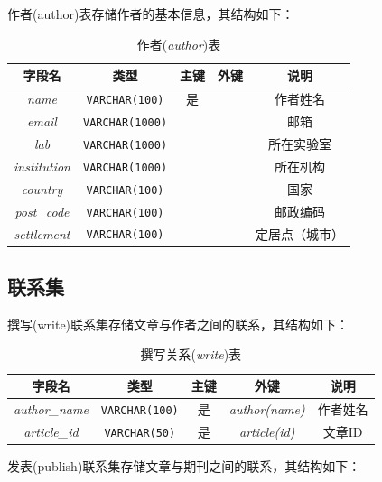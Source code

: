 \documentclass[UTF8,openany]{ctexbook}
\begin{document}
作者(author)表存储作者的基本信息，其结构如下：

\begin{table}[H]
    \centering
    \begin{tabular}{|c|c|c|c|c|}
        \hline
        \textbf{字段名} & \textbf{类型} & \textbf{主键} & \textbf{外键} & \textbf{说明} \\
        \hline
        \textit{name} & \texttt{VARCHAR(100)} & 是 &  & 作者姓名 \\
        \hline
        \textit{email} & \texttt{VARCHAR(1000)} &  &  & 邮箱 \\
        \hline
        \textit{lab} & \texttt{VARCHAR(1000)} &  &  & 所在实验室 \\
        \hline
        \textit{institution} & \texttt{VARCHAR(1000)} &  &  & 所在机构 \\
        \hline
        \textit{country} & \texttt{VARCHAR(100)} &  &  & 国家 \\
        \hline
        \textit{post\_code} & \texttt{VARCHAR(100)} &  &  & 邮政编码 \\
        \hline
        \textit{settlement} & \texttt{VARCHAR(100)} &  &  & 定居点（城市） \\
        \hline
    \end{tabular}
    \caption{作者(\textit{author})表}
\end{table}

\subsection{联系集}

撰写(write)联系集存储文章与作者之间的联系，其结构如下：

\begin{table}[H]
    \centering
    \begin{tabular}{|c|c|c|c|c|}
        \hline
        \textbf{字段名} & \textbf{类型} & \textbf{主键} & \textbf{外键} & \textbf{说明} \\
        \hline
        \textit{author\_name} & \texttt{VARCHAR(100)} & 是 & \textit{author(name)} & 作者姓名 \\
        \hline
        \textit{article\_id} & \texttt{VARCHAR(50)} & 是 & \textit{article(id)} & 文章ID \\
        \hline
    \end{tabular}
    \caption{撰写关系(\textit{write})表}
\end{table}

发表(publish)联系集存储文章与期刊之间的联系，其结构如下：
\end{document}
